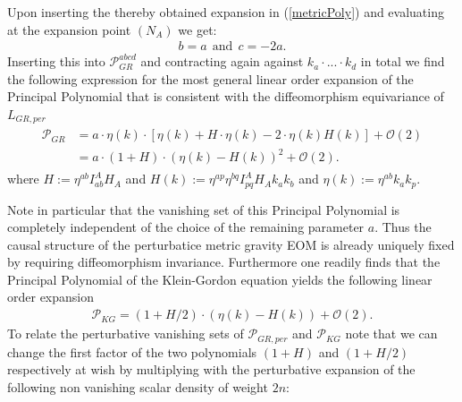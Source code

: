 \documentclass[a4paper,12pt, DIV=14, BCOR=5mm, twoside, headsepline, numbers=noenddot]{scrbook}
\begin{document}
Upon inserting the thereby obtained expansion in (\ref{metricPoly}) and evaluating at the expansion point $(N_A)$ we get:
\begin{align}
    b = a \ \ \text{and} \ \ c = -2a.
\end{align}
Inserting this into $\mathcal{P}_{GR}^{abcd}$ and contracting again against $k_a\cdot ...\cdot k_d$ in total we find the following expression for the most general linear order expansion of the Principal Polynomial that is consistent with the diffeomorphism equivariance of $L_{GR,per}$
\begin{align}
\begin{aligned}
    \mathcal{P}_{GR} &= a \cdot  \eta(k) \cdot \left [\eta(k) + H \cdot \eta(k)  -
    2 \cdot  \eta(k) H(k) \right ] + \mathcal{O}(2)\\
    &= a \cdot (1 + H) \cdot (\eta(k) - H(k))^2 + \mathcal{O}(2).
\end{aligned}
\end{align}
where  $H:=\eta^{ab} I^A_{ab} H_{A}$ and $H(k) := \eta^{ap} \eta^{bq} I_{pq}^A H_A k_a k_b$ and $\eta(k) := \eta^{ab}k_a k_p$. 

Note in particular that the vanishing set of this Principal Polynomial is completely independent of the choice of the remaining parameter $a$. Thus the causal structure of the perturbatice metric gravity EOM is already uniquely fixed by requiring diffeomorphism invariance.
Furthermore one readily finds that the Principal Polynomial of the Klein-Gordon equation yields the following linear order expansion
\begin{align}
    \mathcal{P}_{KG} = (1 + H/2) \cdot (\eta(k) - H(k)) + \mathcal{O}(2) .
\end{align}
To relate the perturbative vanishing sets of $\mathcal{P}_{GR,per}$ and $\mathcal{P}_{KG}$ note that we can change the first factor of the two polynomials $(1+H)$ and $(1+H/2)$ respectively at wish by multiplying with the perturbative expansion of the following non vanishing scalar density of weight $2n$:
\end{document}
